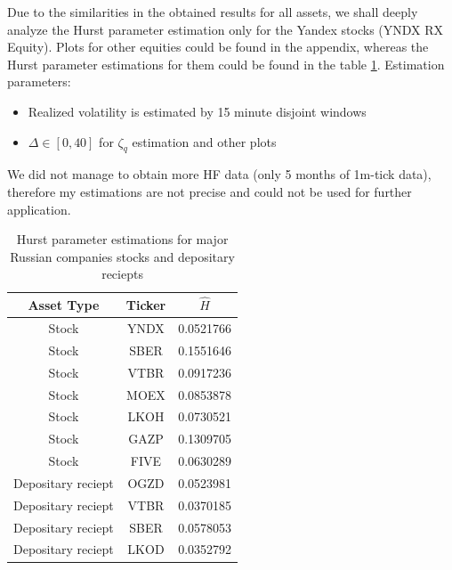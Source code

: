         Due to the similarities in the obtained results for all assets, we shall deeply analyze the Hurst parameter estimation only for the 
        Yandex stocks (YNDX RX Equity). Plots for other equities could be found in the appendix, whereas the Hurst parameter estimations for them 
        could be found in the table \ref{table:hurst_est}. 
        Estimation parameters:
        \begin{itemize}
            \item Realized volatility is estimated by 15 minute disjoint windows
            \item $\Delta \in [0, 40]$ for $\zeta_q$ estimation and other plots
        \end{itemize}

        \begin{nb}
            We did not manage to obtain more HF data (only 5 months of 1m-tick data), therefore my estimations are not precise and could 
            not be used for further application.
        \end{nb}

        \begin{table}[htbp]
            \begin{tabular}{|c|c|c|}
                \hline
                Asset Type               & Ticker & $\hat H$  \\ \hline
                \hline
                Stock                    & YNDX   & 0.0521766 \\ \hline
                Stock                    & SBER   & 0.1551646 \\ \hline
                Stock                    & VTBR   & 0.0917236 \\ \hline
                Stock                    & MOEX   & 0.0853878 \\ \hline
                Stock                    & LKOH   & 0.0730521 \\ \hline
                Stock                    & GAZP   & 0.1309705 \\ \hline
                Stock                    & FIVE   & 0.0630289 \\ \hline
                \hline
                Depositary reciept       & OGZD   & 0.0523981 \\ \hline
                Depositary reciept       & VTBR   & 0.0370185 \\ \hline
                Depositary reciept       & SBER   & 0.0578053 \\ \hline
                Depositary reciept       & LKOD   & 0.0352792 \\ \hline
            \end{tabular}
            \caption{Hurst parameter estimations for major Russian companies stocks and depositary reciepts}
            \label{table:hurst_est}
        \end{table}


